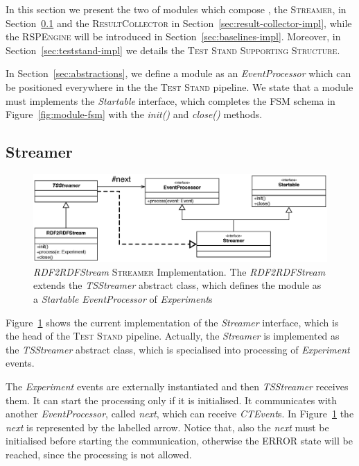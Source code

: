 In this section we present the two of modules which compose \namens, the \textsc{Streamer}, in Section~\ref{sec:streamer-impl} and the \textsc{ResultCollector} in Section~\ref{sec:result-collector-impl}, while the \textsc{RSPEngine} will be introduced in Section~\ref{sec:baselines-impl}. Moreover, in Section~\ref{sec:teststand-impl} we details the \textsc{Test Stand Supporting Structure}. %

In Section~\ref{sec:abstractions}, we define a module as an \textit{EventProcessor} which can be positioned everywhere in the the \textsc{Test Stand} pipeline. We state that a module must implements the \textit{Startable} interface, which completes the FSM schema in Figure~\ref{fig:module-fsm} with the \textit{init()} and \textit{close()} methods.

\subsection{Streamer}	\label{sec:streamer-impl}

\begin{figure}[tbh]
  \centering
	\includegraphics[width=\linewidth]{images/uml_tstreamer}
	\caption[\textit{RDF2RDFStream \textsc{Streamer} Implementation} - UML Schema]{\textit{RDF2RDFStream} \textsc{Streamer} Implementation. The \textit{RDF2RDFStream} extends the \textit{TSStreamer} abstract class, which defines the module as a \textit{Startable} \textit{EventProcessor} of \textit{Experiment}s} 
  	\label{fig:uml_tstreamer}
\end{figure}

\noindent Figure~\ref{fig:uml_tstreamer} shows the current implementation of the \textit{Streamer} interface, which is the head of  the \textsc{Test Stand} pipeline. Actually, the \textit{Streamer} is implemented as the \textit{TSStreamer} abstract class, which is specialised into processing of \textit{Experiment} events. 

The \textit{Experiment} events are  externally instantiated and then \textit{TSStreamer} receives them. It can start the processing only if it is initialised. It communicates with another \textit{EventProcessor}, called \textit{next}, which can receive  \textit{CTEvent}s. In Figure~\ref{fig:uml_tstreamer} the \textit{next} is represented by the labelled arrow.  Notice that, also the \textit{next} must be initialised before starting the communication, otherwise the ERROR state will be reached, since the processing is not allowed.

